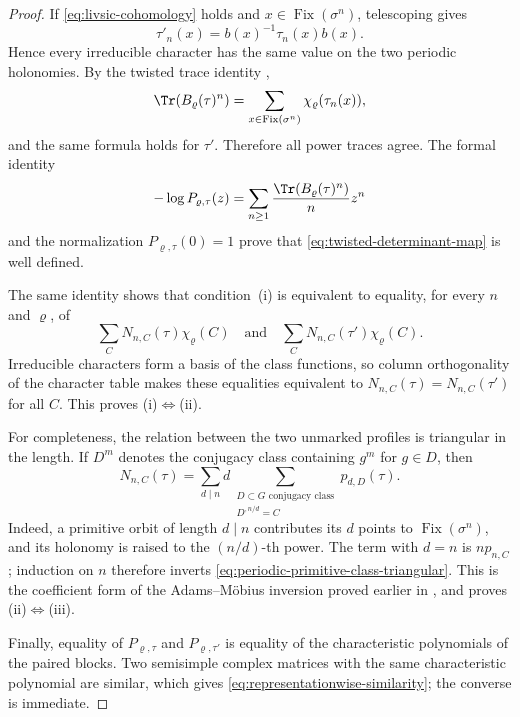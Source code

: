 \begin{proof}
  If \eqref{eq:livsic-cohomology} holds and \(x\in\operatorname{Fix}
  (\sigma^n)\), telescoping gives
  \[
    \tau'_n(x)=b(x)^{-1}\tau_n(x)b(x).
  \]
  Hence every irreducible character has the same value on the two periodic
  holonomies.  By the twisted trace identity
  ,
  \[
    \Tr(B_\varrho(\tau)^n)
    =\sum_{x\in\operatorname{Fix}(\sigma^n)}
       \chi_\varrho(\tau_n(x)),
  \]
  and the same formula holds for \(\tau'\).  Therefore all power traces
  agree.  The formal identity
  \begin{equation}\label{eq:determinant-log-kernel-proof}
    -\log P_{\varrho,\tau}(z)
    =\sum_{n\ge1}\frac{\Tr(B_\varrho(\tau)^n)}{n}z^n
  \end{equation}
  and the normalization \(P_{\varrho,\tau}(0)=1\) prove that
  \eqref{eq:twisted-determinant-map} is well defined.

  The same identity shows that condition~\textup{(i)} is equivalent to
  equality, for every \(n\) and \(\varrho\), of
  \[
    \sum_C N_{n,C}(\tau)\chi_\varrho(C)
    \quad\text{and}\quad
    \sum_C N_{n,C}(\tau')\chi_\varrho(C).
  \]
  Irreducible characters form a basis of the class functions, so column
  orthogonality of the character table makes these equalities equivalent to
  \(N_{n,C}(\tau)=N_{n,C}(\tau')\) for all \(C\).  This proves
  \textup{(i)}\(\Longleftrightarrow\)\textup{(ii)}.

  For completeness, the relation between the two unmarked profiles is
  triangular in the length.  If \(D^m\) denotes the conjugacy class
  containing \(g^m\) for \(g\in D\), then
  \begin{equation}\label{eq:periodic-primitive-class-triangular}
    N_{n,C}(\tau)
    =\sum_{d\mid n}d
      \sum_{\substack{D\subset G\text{ conjugacy class}\\
                      D^{,n/d}=C}}
        p_{d,D}(\tau).
  \end{equation}
  Indeed, a primitive orbit of length \(d\mid n\) contributes its \(d\)
  points to \(\operatorname{Fix}(\sigma^n)\), and its holonomy is raised to
  the \((n/d)\)-th power.  The term with \(d=n\) is
  \(n p_{n,C}\); induction on \(n\) therefore inverts
  \eqref{eq:periodic-primitive-class-triangular}.  This is the coefficient
  form of the Adams--M\"obius inversion proved earlier in
  , and
  proves \textup{(ii)}\(\Longleftrightarrow\)\textup{(iii)}.

  Finally, equality of \(P_{\varrho,\tau}\) and
  \(P_{\varrho,\tau'}\) is equality of the characteristic polynomials of
  the paired blocks.  Two semisimple complex matrices with the same
  characteristic polynomial are similar, which gives
  \eqref{eq:representationwise-similarity}; the converse is immediate.
\end{proof}

